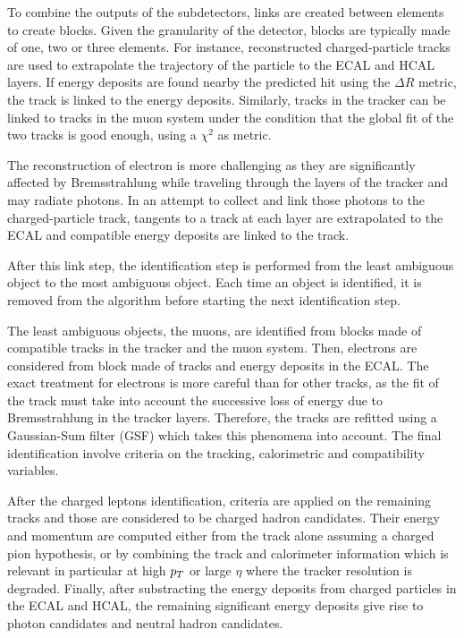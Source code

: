        To combine the outputs of the subdetectors, links are created between elements
        to create blocks. Given the granularity of the detector, blocks are typically made
        of one, two or three elements. For instance, reconstructed charged-particle tracks
        are used to extrapolate the trajectory of the particle to the ECAL and HCAL layers.
        If energy deposits are found nearby the predicted hit using the $\Delta R$
        metric, the track is linked to the energy deposits. Similarly, tracks in the
        tracker can be linked to tracks in the muon system under the condition that the
        global fit of the two tracks is good enough, using a $\chi^2$ as metric.

        The reconstruction of electron is more challenging as they are significantly
        affected by Bremsstrahlung while traveling through the layers of the tracker
        and may radiate photons. In an attempt to collect and link those photons to the
        charged-particle track, tangents to a track at each layer are extrapolated to the
        ECAL and compatible energy deposits are linked to the track.

        After this link step, the identification step is performed from the least ambiguous
        object to the most ambiguous object. Each time an object is identified, it is
        removed from the algorithm before starting the next identification step.

        The least ambiguous objects, the muons, are identified from blocks made of compatible
        tracks in the tracker and the muon system. Then, electrons are considered from
        block made of tracks and energy deposits in the ECAL. The exact treatment for
        electrons is more careful than for other tracks, as the fit of the track must take
        into account the successive loss of energy due to Bremsstrahlung in the tracker
        layers. Therefore, the tracks are refitted using a Gaussian-Sum filter (GSF)
        \cite{GSFelectrons} which takes this phenomena into account. The final identification
        involve criteria on the tracking, calorimetric and compatibility variables.

        After the charged leptons identification, criteria are applied on the remaining
        tracks and those are considered to be charged hadron candidates. Their energy
        and momentum are computed either from the track alone assuming a charged pion
        hypothesis, or by combining the track and calorimeter information which is relevant
        in particular at high $p_T$ or large $\eta$ where the tracker resolution is
        degraded. Finally, after substracting the energy deposits from charged particles
        in the ECAL and HCAL, the remaining significant energy deposits give rise to photon
        candidates and neutral hadron candidates.

